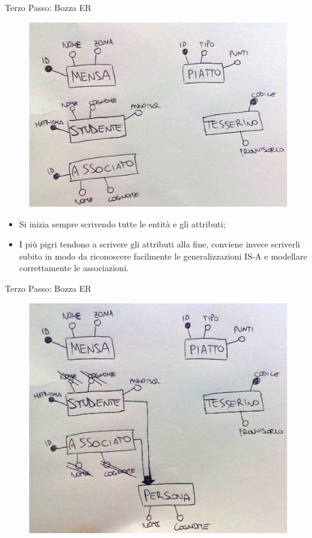 \begin{frame}{Terzo Passo: Bozza ER}
\begin{minipage}[t]{0.6\linewidth}
\begin{figure}
    \centering
    \includegraphics[width=\textwidth]{img/bozza-er.png}
\end{figure}
\end{minipage}%
\hfill%
\begin{minipage}[t]{0.35\linewidth}
\vspace{.3cm}
\begin{itemize}[<+->]
    \item Si inizia sempre scrivendo tutte le entit\`a e gli attributi;
    \item I pi\`u pigri tendono a scrivere gli attributi alla fine, conviene invece scriverli subito in modo da riconoscere facilmente le generalizzazioni IS-A e modellare correttamente le associazioni.
\end{itemize}
\end{minipage}
\end{frame}
%
\begin{frame}{Terzo Passo: Bozza ER}
\vspace{-.65cm}
\begin{figure}
    \centering
    \includegraphics[width=.55\textwidth]{img/bozza-er-generalizzazioni.png}
\end{figure}
\end{frame}
